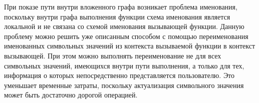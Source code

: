При показе пути внутри вложенного графа возникает проблема именования, поскольку внутри графа выполнения функции схема именования является локальной и не связана со схемой именования вызывающей функции. Данную проблему можно решить уже описанным способом с помощью переименования именованных символьных значений из контекста вызываемой функции в контекст вызывающей. При этом можно выполнять переименование не для всех символьных значений, имеющихся внутри пути выполнения, а только для тех, информация о которых непосредственно представляется пользователю. Это уменьшает временные затраты, поскольку актуализация символьного значения может быть достаточно дорогой операцией.

